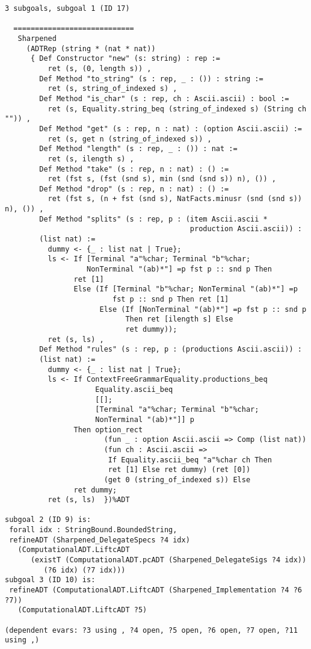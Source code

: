 \begin{verbatim}
3 subgoals, subgoal 1 (ID 17)
  
  ============================
   Sharpened
     (ADTRep (string * (nat * nat))
      { Def Constructor "new" (s: string) : rep :=
          ret (s, (0, length s)) ,
        Def Method "to_string" (s : rep, _ : ()) : string :=
          ret (s, string_of_indexed s) ,
        Def Method "is_char" (s : rep, ch : Ascii.ascii) : bool :=
          ret (s, Equality.string_beq (string_of_indexed s) (String ch "")) ,
        Def Method "get" (s : rep, n : nat) : (option Ascii.ascii) :=
          ret (s, get n (string_of_indexed s)) ,
        Def Method "length" (s : rep, _ : ()) : nat :=
          ret (s, ilength s) ,
        Def Method "take" (s : rep, n : nat) : () :=
          ret (fst s, (fst (snd s), min (snd (snd s)) n), ()) ,
        Def Method "drop" (s : rep, n : nat) : () :=
          ret (fst s, (n + fst (snd s), NatFacts.minusr (snd (snd s)) n), ()) ,
        Def Method "splits" (s : rep, p : (item Ascii.ascii *
                                           production Ascii.ascii)) : 
        (list nat) :=
          dummy <- {_ : list nat | True};
          ls <- If [Terminal "a"%char; Terminal "b"%char;
                   NonTerminal "(ab)*"] =p fst p :: snd p Then 
                ret [1]
                Else (If [Terminal "b"%char; NonTerminal "(ab)*"] =p
                         fst p :: snd p Then ret [1]
                      Else (If [NonTerminal "(ab)*"] =p fst p :: snd p
                            Then ret [ilength s] Else 
                            ret dummy));
          ret (s, ls) ,
        Def Method "rules" (s : rep, p : (productions Ascii.ascii)) : 
        (list nat) :=
          dummy <- {_ : list nat | True};
          ls <- If ContextFreeGrammarEquality.productions_beq
                     Equality.ascii_beq
                     [[];
                     [Terminal "a"%char; Terminal "b"%char;
                     NonTerminal "(ab)*"]] p
                Then option_rect
                       (fun _ : option Ascii.ascii => Comp (list nat))
                       (fun ch : Ascii.ascii =>
                        If Equality.ascii_beq "a"%char ch Then 
                        ret [1] Else ret dummy) (ret [0])
                       (get 0 (string_of_indexed s)) Else 
                ret dummy;
          ret (s, ls)  })%ADT

subgoal 2 (ID 9) is:
 forall idx : StringBound.BoundedString,
 refineADT (Sharpened_DelegateSpecs ?4 idx)
   (ComputationalADT.LiftcADT
      (existT (ComputationalADT.pcADT (Sharpened_DelegateSigs ?4 idx))
         (?6 idx) (?7 idx)))
subgoal 3 (ID 10) is:
 refineADT (ComputationalADT.LiftcADT (Sharpened_Implementation ?4 ?6 ?7))
   (ComputationalADT.LiftcADT ?5)

(dependent evars: ?3 using , ?4 open, ?5 open, ?6 open, ?7 open, ?11 using ,)
\end{verbatim}



